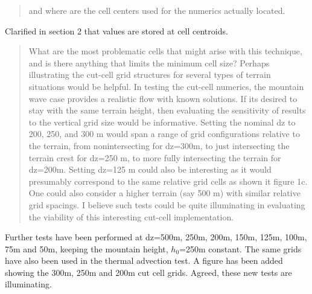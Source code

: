 \documentclass{article}
\begin{document}
\begin{quotation}
and where are the cell centers used for the numerics actually
located.
\end{quotation}
Clarified in section 2 that values are stored at cell centroids.

\begin{quotation}
What are the most problematic cells that might arise with this
technique, and is there anything that limits the minimum cell size?
Perhaps illustrating the cut-cell grid structures for several types
of terrain situations would be helpful. In testing the cut-cell 
numerics, the mountain wave case provides a realistic flow with
known solutions. If its desired to stay with the same terrain height,
then evaluating the sensitivity of results to the vertical grid size
would be informative. Setting the nominal dz to 200, 250, and 300 m
would span a range of grid configurations relative to the terrain,
from nonintersecting for dz=300m, to just intersecting the terrain
crest for dz=250 m, to more fully intersecting the terrain for
dz=200m. Setting dz=125 m could also be interesting as it would
presumably correspond to the same relative grid cells as shown it
figure 1c. One could also consider a higher terrain (say 500 m) with
similar relative grid spacings. I believe such tests could be quite
illuminating in evaluating the viability of this interesting cut-cell
implementation.
\end{quotation}
Further tests have been performed at dz=500m, 250m, 200m, 150m, 125m,
100m, 75m and 50m, keeping the mountain height, $h_0$=250m constant.  The
same grids have also been used in the thermal advection test.  A figure
has been added showing the 300m, 250m and 200m cut cell grids. Agreed, these new tests are illuminating. 
\end{document}
